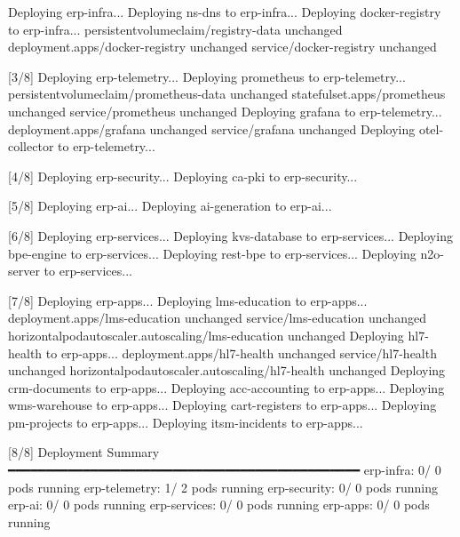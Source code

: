 \documentclass[12pt,a4paper]{article}
\let\originalfootnotesize\footnotesize
\let\oldverbatim\verbatim
\let\oldendverbatim\endverbatim
\renewenvironment{verbatim}{\originalfootnotesize\oldverbatim}{\oldendverbatim}
\begin{document}
\begin{verbatim}
[2/8] Deploying erp-infra...
    Deploying ns-dns to erp-infra...
    Deploying docker-registry to erp-infra...
persistentvolumeclaim/registry-data unchanged
deployment.apps/docker-registry unchanged
service/docker-registry unchanged

[3/8] Deploying erp-telemetry...
    Deploying prometheus to erp-telemetry...
persistentvolumeclaim/prometheus-data unchanged
statefulset.apps/prometheus unchanged
service/prometheus unchanged
    Deploying grafana to erp-telemetry...
deployment.apps/grafana unchanged
service/grafana unchanged
    Deploying otel-collector to erp-telemetry...

[4/8] Deploying erp-security...
    Deploying ca-pki to erp-security...

[5/8] Deploying erp-ai...
    Deploying ai-generation to erp-ai...

[6/8] Deploying erp-services...
    Deploying kvs-database to erp-services...
    Deploying bpe-engine to erp-services...
    Deploying rest-bpe to erp-services...
    Deploying n2o-server to erp-services...

[7/8] Deploying erp-apps...
    Deploying lms-education to erp-apps...
deployment.apps/lms-education unchanged
service/lms-education unchanged
horizontalpodautoscaler.autoscaling/lms-education unchanged
    Deploying hl7-health to erp-apps...
deployment.apps/hl7-health unchanged
service/hl7-health unchanged
horizontalpodautoscaler.autoscaling/hl7-health unchanged
    Deploying crm-documents to erp-apps...
    Deploying acc-accounting to erp-apps...
    Deploying wms-warehouse to erp-apps...
    Deploying cart-registers to erp-apps...
    Deploying pm-projects to erp-apps...
    Deploying itsm-incidents to erp-apps...

[8/8] Deployment Summary
    ━━━━━━━━━━━━━━━━━━━━━━━━━━━━━━━━━━━━━━━━━━━━━━━
               erp-infra:        0/       0 pods running
           erp-telemetry:        1/       2 pods running
            erp-security:        0/       0 pods running
                  erp-ai:        0/       0 pods running
            erp-services:        0/       0 pods running
                erp-apps:        0/       0 pods running
\end{verbatim}
\end{document}
